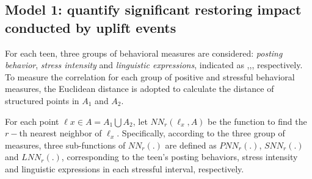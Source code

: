 \subsection{Model 1: quantify significant restoring impact conducted by uplift events}
\label{mod:mod1}
For each teen, three groups of behavioral measures are considered: \emph{posting behavior},
\emph{stress intensity} and \emph{linguistic expressions},
indicated as ,,, respectively.
To measure the correlation for each group of positive and stressful behavioral measures,
the Euclidean distance is adopted to calculate the distance of structured points in $A_1$ and $A_2$.

For each point $\ell x \in A=A_1\bigcup A_2$,
let $NN_r(\ell_x,A)$ be the function to find the $r-$th nearest neighbor of $\ell_x$.
Specifically, according to the three group of measures,
three sub-functions of $NN_r(.)$ are defined as $PNN_r(.)$, $SNN_r(.)$ and $LNN_r(.)$,
corresponding to the teen's posting behaviors, stress intensity and linguistic expressions in each stressful interval,  respectively.

